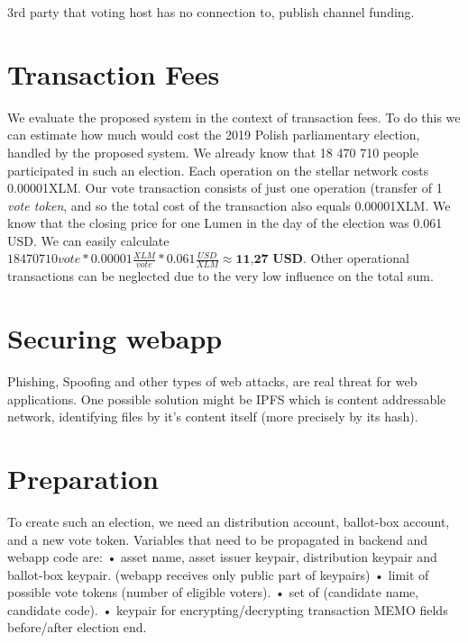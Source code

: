 \documentclass[runningheads]{llncs}
\begin{document}
3rd party that voting host has no connection to, publish channel funding. 


\section{Transaction Fees}
We evaluate the proposed system in the context of transaction fees. To do this we can estimate how much would cost the 2019 Polish parliamentary election, handled by the proposed system. We already know that 18 470 710 people participated in such an election. Each operation on the stellar network costs 0.00001XLM. Our vote transaction consists of just one operation (transfer of 1 \textit{vote token}, and so the total cost of the transaction also equals 0.00001XLM. We know that the closing price for one Lumen in the day of the election was 0.061 USD. We can easily calculate \(18470710 vote * 0.00001 \frac{XLM}{vote} * 0.061 \frac{USD}{XLM} \approx \textbf{11,27 USD}\). Other operational transactions can be neglected due to the very low influence on the total sum.

\section{Securing webapp}
Phishing, Spoofing and other types of web attacks, are real threat for web applications. One possible solution might be IPFS which is content addressable network, identifying files by it's content itself (more precisely by its hash).


\section{Preparation}
To create such an election, we need an distribution account, ballot-box account, and a new vote token. Variables that need to be propagated in backend and webapp code are:
• asset name, asset issuer keypair, distribution keypair and ballot-box keypair. (webapp receives only public part of keypairs)
• limit of possible vote tokens (number of eligible voters). 
• set of (candidate name, candidate code).
• keypair for encrypting/decrypting transaction MEMO fields before/after election end.
\end{document}

